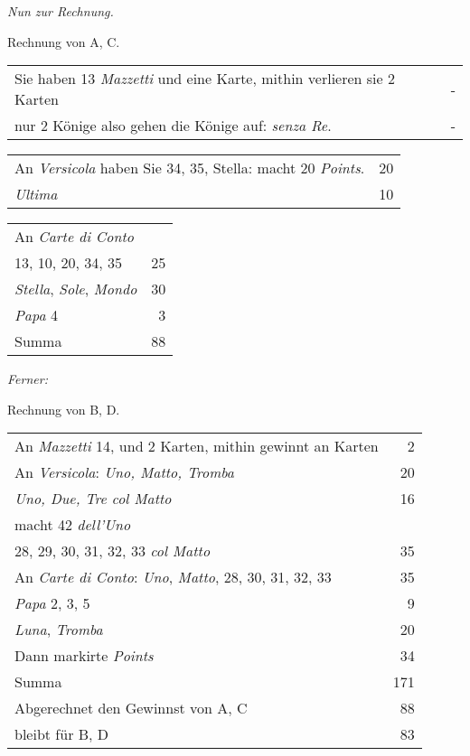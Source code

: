 \documentclass[11pt,a6paper,twoside]{article}
\begin{document}
{\kern4pt \centering\itshape Nun zur Rechnung.\\\kern 3pt}

Rechnung von A, C.\\
\begin{tabular}{@{}b{6.5cm}@{\hspace{2em}}r}
Sie haben 13 \textit{Mazzetti} und eine Karte, mithin verlieren sie 2 Karten&-\\
nur 2 Könige also gehen die Könige auf: \textit{senza Re}.&-\\
\end{tabular}
\begin{tabular}{@{}b{6.5cm}r}
An \textit{Versicola} haben Sie
34, 35, Stella: macht 20 \textit{Points}.& 20\\
\textit{Ultima}& 10\\
\end{tabular}
\begin{tabular}{@{}b{6.5cm}r}
An \textit{Carte di Conto}\\
13, 10, 20, 34, 35& 25\\
\textit{Stella}, \textit{Sole}, \textit{Mondo} & 30\\
\textit{Papa} 4 &3 \\
Summa &88
\end{tabular}

{\kern4pt \centering\itshape {Ferner:}\\\kern 3pt}

Rechnung von B, D.\\
\begin{tabular}{@{}b{6.5cm}r}
An \textit{Mazzetti} 14, und 2 Karten,
mithin gewinnt an Karten & 2\\
An \textit{Versicola}:
\textit{Uno, Matto, Tromba}& 20\\
\textit{Uno, Due, Tre col Matto}& 16\\
macht 42 \textit{dell'Uno}\\
28, 29, 30, 31, 32, 33 \textit{col Matto}& 35\\
An \textit{Carte di Conto}:
\textit{Uno}, \textit{Matto}, 28, 30, 31, 32, 33& 35\\
\textit{Papa} 2, 3, 5& 9\\
\textit{Luna}, \textit{Tromba}& 20\\
Dann markirte \textit{Points}& 34\\
Summa \dotfill& 171\\
  Abgerechnet den Gewinnst von A, C &88\\
bleibt für B, D &83\\
\end{tabular}
\end{document}
